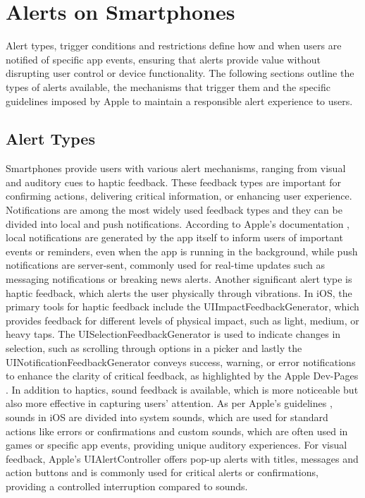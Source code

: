 \section{Alerts on Smartphones}
Alert types, trigger conditions and restrictions define how and when users are notified of specific app events, ensuring that alerts provide value without disrupting user control or device functionality. The following sections outline the types of alerts available, the mechanisms that trigger them and the specific guidelines imposed by Apple to maintain a responsible alert experience to users.

\subsection{Alert Types}
Smartphones provide users with various alert mechanisms, ranging from visual and auditory cues to haptic feedback. These feedback types are important for confirming actions, delivering critical information, or enhancing user experience. Notifications are among the most widely used feedback types and they can be divided into local and push notifications. According to Apple's documentation \cite{apple_local_notifications}\cite{apple_push_notifications}, local notifications are generated by the app itself to inform users of important events or reminders, even when the app is running in the background, while push notifications are server-sent, commonly used for real-time updates such as messaging notifications or breaking news alerts.
Another significant alert type is haptic feedback, which alerts the user physically through vibrations. In iOS, the primary tools for haptic feedback include the UIImpactFeedbackGenerator, which provides feedback for different levels of physical impact, such as light, medium, or heavy taps. 
The UISelectionFeedbackGenerator is used to indicate changes in selection, such as scrolling through options in a picker and lastly the UINotificationFeedbackGenerator conveys success, warning, or error notifications to enhance the clarity of critical feedback, as highlighted by the Apple Dev-Pages \cite{apple_haptics}.
In addition to haptics, sound feedback is available, which is more noticeable but also more effective in capturing users' attention. As per Apple's guidelines \cite{apple_sound_guidelines}, sounds in iOS are divided into system sounds, which are used for standard actions like errors or confirmations and custom sounds, which are often used in games or specific app events, providing unique auditory experiences. 
For visual feedback, Apple's UIAlertController \cite{apple_alerts} offers pop-up alerts with titles, messages and action buttons and is commonly used for critical alerts or confirmations, providing a controlled interruption compared to sounds.
